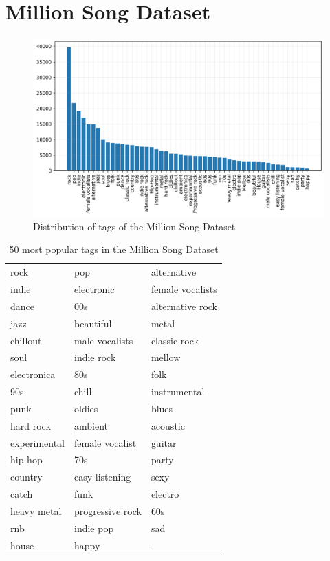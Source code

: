 \section{Million Song Dataset}

\begin{figure}[t]
    \centering
    \includegraphics[width=\columnwidth]{figs/tag_stats_msd.png}
    \caption{Distribution of tags of the Million Song Dataset}
    \label{fig:tag_stats_msd}
\end{figure}


\begin{table}[t]
    \centering
    \begin{tabular}{lll}\toprule
        rock & pop & alternative \\
        indie & electronic & female vocalists \\
        dance & 00s & alternative rock \\
        jazz & beautiful & metal \\
        chillout & male vocalists & classic rock \\
        soul & indie rock & mellow \\
        electronica & 80s & folk \\
        90s & chill & instrumental \\
        punk & oldies & blues \\
        hard rock & ambient & acoustic \\
        experimental & female vocalist & guitar \\
        hip-hop & 70s & party \\
        country & easy listening & sexy \\
        catch & funk & electro \\
        heavy metal & progressive rock & 60s \\
        rnb & indie pop & sad \\
        house & happy & - \\
        \bottomrule
    \end{tabular}
    \caption{50 most popular tags in the Million Song Dataset}
    \label{tab:msd_tags}
\end{table}




